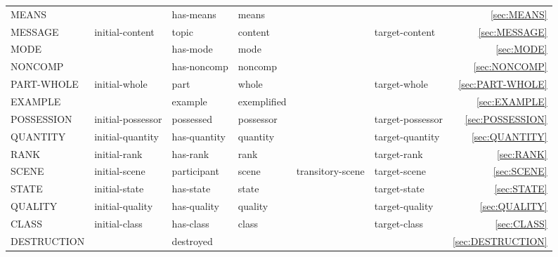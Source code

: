 \documentclass[a4paper]{article}
\newcommand{\fr}[1]{\textsf{#1}}
\newcommand{\rl}[1]{\textsf{#1}}
\newcommand{\Sub}{\textnoto{└} }
\newcommand{\SubSub}{\textcolor{white}{\Sub}\Sub}
\newcommand{\SubSubSub}{\textcolor{white}{\Sub}\SubSub}
\begin{document}
\begin{table}
{\begin{NiceTabular}{llllllr}
            \Sub{} \fr{MEANS} & & \rl{has-means} & \rl{means} & & & \ref{sec:MEANS} \\

            \Sub{} \fr{MESSAGE} & \rl{initial-content} & \rl{topic} & \rl{content} & & \rl{target-content} & \ref{sec:MESSAGE} \\

            \Sub{} \fr{MODE} & & \rl{has-mode} & \rl{mode} & & & \ref{sec:MODE} \\

            \Sub{} \fr{NONCOMP} & & \rl{has-noncomp} & \rl{noncomp} & & & \ref{sec:NONCOMP} \\

            \Sub{} \fr{PART-WHOLE} & \rl{initial-whole} & \rl{part} & \rl{whole} & & \rl{target-whole} & \ref{sec:PART-WHOLE} \\
            \SubSub{} \fr{EXAMPLE} & \rl{} & \rl{example} & \rl{exemplified} & & \rl{} & \ref{sec:EXAMPLE} \\

            \Sub{} \fr{POSSESSION} & \rl{initial-possessor} & \rl{possessed} & \rl{possessor} & & \rl{target-possessor} & \ref{sec:POSSESSION} \\

            \Sub{} \fr{QUANTITY} & \rl{initial-quantity} & \rl{has-quantity} & \rl{quantity} & & \rl{target-quantity} & \ref{sec:QUANTITY} \\

            \Sub{} \fr{RANK} & \rl{initial-rank} & \rl{has-rank} & \rl{rank} & & \rl{target-rank} & \ref{sec:RANK} \\

            \Sub{} \fr{SCENE} & \rl{initial-scene} & \rl{participant} & \rl{scene} & \rl{transitory-scene} & \rl{target-scene} & \ref{sec:SCENE} \\

            \Sub{} \fr{STATE} & \rl{initial-state} & \rl{has-state} & \rl{state} & & \rl{target-state} & \ref{sec:STATE} \\
            \SubSub{} \fr{QUALITY} & \rl{initial-quality}& \rl{has-quality} & \rl{quality} & & \rl{target-quality} & \ref{sec:QUALITY} \\
            \SubSubSub{} \fr{CLASS} & \rl{initial-class} & \rl{has-class} & \rl{class} & & \rl{target-class} & \ref{sec:CLASS} \\
            \SubSub{} \fr{DESTRUCTION} & & \rl{destroyed} & & & & \ref{sec:DESTRUCTION} \\


\end{NiceTabular}}
\end{table}
\end{document}
